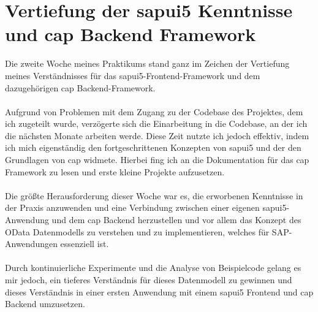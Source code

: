\section{Vertiefung der \gls{sapui5} Kenntnisse und \gls{cap} Backend Framework}
Die zweite Woche meines Praktikums stand ganz im Zeichen der Vertiefung meines Verständnisses für das \gls{sapui5}-Frontend-Framework und dem dazugehörigen \gls{cap} Backend-Framework. \\\\
Aufgrund von Problemen mit dem Zugang zu der Codebase des Projektes, dem ich zugeteilt wurde, verzögerte sich die Einarbeitung in die Codebase, an der ich die nächsten Monate arbeiten werde. Diese Zeit nutzte ich jedoch effektiv, indem ich mich eigenständig den fortgeschrittenen Konzepten von \gls{sapui5} und der den Grundlagen von \gls{cap} widmete. Hierbei fing ich an die Dokumentation für das \gls{cap} Framework zu lesen und erste kleine Projekte aufzusetzen. \\\\
Die größte Herausforderung dieser Woche war es, die erworbenen Kenntnisse in der Praxis anzuwenden und eine Verbindung zwischen einer eigenen \gls{sapui5}-Anwendung und dem \gls{cap} Backend herzustellen und vor allem das Konzept des OData Datenmodells zu verstehen und zu implementieren, welches für SAP-Anwendungen essenziell ist. \\\\
Durch kontinuierliche Experimente und die Analyse von Beispielcode gelang es mir jedoch, ein tieferes Verständnis für dieses Datenmodell zu gewinnen und dieses Verständnis in einer ersten Anwendung mit einem \gls{sapui5} Frontend und \gls{cap} Backend umzusetzen. \\\\

